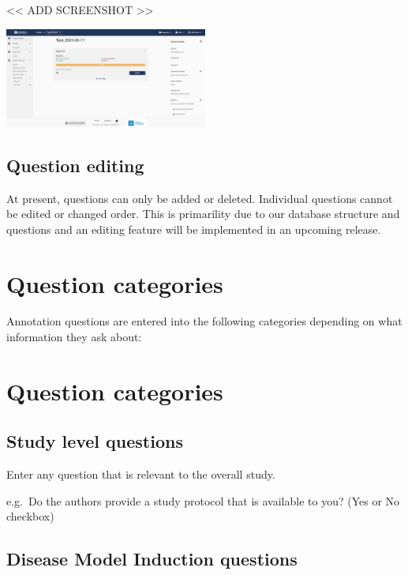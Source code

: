 \documentclass[
]{book}
\begin{document}
\textless{}\textless{} ADD SCREENSHOT \textgreater{}\textgreater{}

\includegraphics[width=0.5\textwidth,height=0.5\textheight]{figs/06_01_project_nav.png}

\hypertarget{question-editing}{%
\subsection{Question editing}\label{question-editing}}

At present, questions can only be added or deleted. Individual questions cannot be edited or changed order. This is primarility due to our database structure and questions and an editing feature will be implemented in an upcoming release.

\hypertarget{question-categories}{%
\section{Question categories}\label{question-categories}}

Annotation questions are entered into the following categories depending on what information they ask about:

\hypertarget{question-categories-1}{%
\section{Question categories}\label{question-categories-1}}

\hypertarget{study-level-questions}{%
\subsection{Study level questions}\label{study-level-questions}}

Enter any question that is relevant to the overall study.

e.g.~Do the authors provide a study protocol that is available to you?
(Yes or No checkbox)

\hypertarget{disease-model-induction-questions}{%
\subsection{Disease Model Induction questions}\label{disease-model-induction-questions}}
\end{document}

